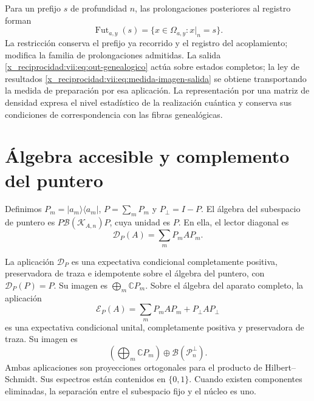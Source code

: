 Para un prefijo \(s\) de profundidad \(n\), las prolongaciones posteriores
al registro forman
\[
 \operatorname{Fut}_{a,y}(s)
 =\{x\in\Omega_{a,y}:x|_n=s\}.
\]
La restricción conserva el prefijo ya recorrido y el registro del
acoplamiento; modifica la familia de prolongaciones admitidas. La salida
\eqref{x_reciprocidad:vii:eq:out-genealogico} actúa sobre estados completos; la ley de
resultados \eqref{x_reciprocidad:vii:eq:medida-imagen-salida} se obtiene transportando
la medida de preparación por esa aplicación. La representación por una
matriz de densidad expresa el nivel
estadístico de la realización cuántica y conserva sus condiciones de
correspondencia con las fibras genealógicas.



\section{Álgebra accesible y complemento del puntero}
\label{x_reciprocidad:vii:sec:observador-expectativa}

Definimos \(P_m=|a_m\rangle\langle a_m|\),
\(P=\sum_mP_m\) y \(P_\perp=I-P\). El álgebra del subespacio de
puntero es \(P\mathcal B(\mathcal K_{A,n})P\), cuya unidad es \(P\).
En ella, el lector diagonal es
\[
 \mathcal D_P(A)=\sum_mP_mAP_m.
\]

\begin{proposition}
\label{x_reciprocidad:vii:prop:observador-pinzamiento}
La aplicación \(\mathcal D_P\) es una expectativa condicional
completamente positiva, preservadora de traza e idempotente sobre el
álgebra del puntero, con \(\mathcal D_P(P)=P\). Su imagen es
\(\bigoplus_m\mathbb CP_m\).
Sobre el álgebra del aparato completo, la aplicación
\begin{equation}
 \mathcal E_P(A)=\sum_mP_mAP_m+P_\perp AP_\perp
 \label{x_reciprocidad:vii:eq:observador-complemento}
\end{equation}
es una expectativa condicional unital, completamente positiva y
preservadora de traza. Su imagen es
\[
 \left(\bigoplus_m\mathbb CP_m\right)
 \oplus\mathcal B(\mathcal P_n^\perp).
\]
Ambas aplicaciones son proyecciones ortogonales para el producto de
Hilbert--Schmidt. Sus espectros están contenidos en \(\{0,1\}\).
Cuando existen componentes eliminadas, la separación entre el
subespacio fijo y el núcleo es uno.
\end{proposition}

